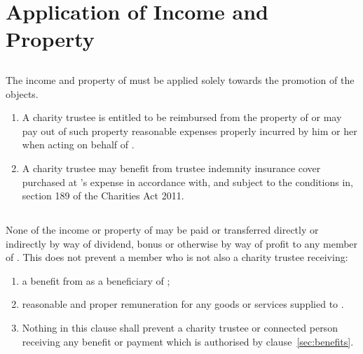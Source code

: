 \section{Application of Income and Property}
\label{sec:income}
    \subsection{}The income and property of \shortname{} must be applied solely towards the promotion of the objects.
    \begin{enumerate}
        \item A charity trustee is entitled to be reimbursed from the property of \shortname{} or may pay out of such property reasonable expenses properly incurred by him or her when acting on behalf of \shortname{}.
        \item A charity trustee may benefit from trustee indemnity insurance cover purchased at \shortname{}'s expense in accordance with, and subject to the conditions in, section 189 of the Charities Act 2011.
    \end{enumerate}

    \subsection{}None of the income or property of \shortname{} may be paid or transferred directly or indirectly by way of dividend, bonus or otherwise by way of profit to any member of \shortname{}. This does not prevent a member who is not also a charity trustee receiving:
    \begin{enumerate}
        \item a benefit from \shortname{} as a beneficiary of \shortname{};
        \item reasonable and proper remuneration for any goods or services supplied to \shortname{}.
        \item Nothing in this clause shall prevent a charity trustee or connected person receiving any benefit or payment which is authorised by clause~\ref{sec:benefits}.
    \end{enumerate}

